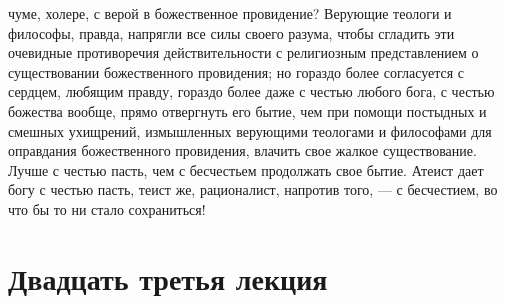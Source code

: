 \documentclass[12pt]{article}
\begin{document}
чуме, холере, с верой в божественное провидение? Верующие теологи и философы, правда, напрягли все силы своего разума, чтобы сгладить эти очевидные противоречия действительности с религиозным представлением о существовании божественного провидения; но гораздо более согласуется с сердцем, любящим правду, гораздо более даже с честью любого бога, с честью божества вообще, прямо отвергнуть его бытие, чем при помощи постыдных и смешных ухищрений, измышленных верующими теологами и философами для оправдания божественного провидения, влачить свое жалкое существование. Лучше с честью пасть, чем с бесчестьем продолжать свое бытие. Атеист дает богу с честью пасть, теист же, рационалист, напротив того, --- с бесчестием, во что бы то ни стало сохраниться! 

\section*{Двадцать третья лекция}
\end{document}
